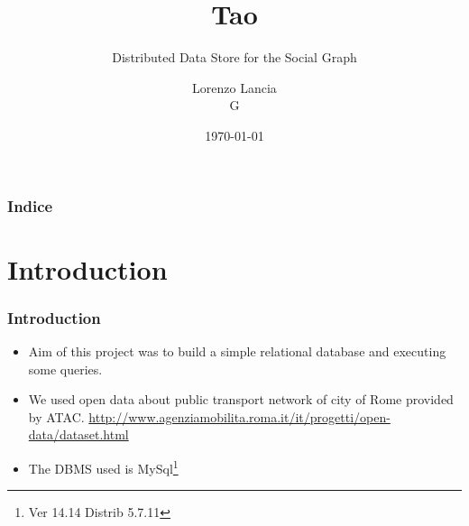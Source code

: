 \documentclass{beamer}
\title[Fb Tao]{
   Tao }
\subtitle{Distributed Data Store for the Social Graph}
\author[L. Lancia \& G]{
  Lorenzo Lancia \\ G
  }
\institute[Sapienza Università di Roma]{
  Master Degree in Data Science \\
  Sapienza Università di Roma}
\date[\today]{
 \today}
\begin{document}
\begin{frame}
  \titlepage
\end{frame}

\begin{frame}
  \frametitle{Indice}

  \tableofcontents
\end{frame}

\section{Introduction}
\begin{frame}
  \frametitle{Introduction}
  \begin{itemize}
  \item Aim of this project was to build a simple relational database
    and executing some queries.

    \item We used open data about public transport network of city of Rome
    provided by ATAC. \url{http://www.agenziamobilita.roma.it/it/progetti/open-data/dataset.html}
  
   \item The DBMS used is MySql\footnote{Ver 14.14 Distrib 5.7.11}
  \end{itemize}

 \end{frame}
\end{document}
